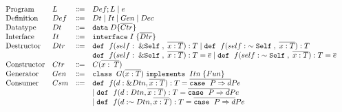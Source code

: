 \documentclass[ oneside,%
                    author={James Elgar},
                    degree={MEng},
                     title={Bidirectional transformer between functional and \\ object-oriented programming in Rust},
                  subtitle={}]{dissertation}
\begin{document}
\begin{figure}[t]
  \begin{displaymath}
    \begin{array}{l}
      \begin{array}{llcl}
        \text{Program}
        & L & \Coloneqq & Def ; L \mid e\\
        \text{Definition}
        & Def & \Coloneqq & Dt \mid It \mid Gen \mid  Dec \\
        \text{Datatype}
         & Dt & \Coloneqq & \texttt{data} \; D \{ {\overline{{Ctr}}} \}\\
        \text{Interface}
         & It & \Coloneqq & \texttt{interface} \; I \; \{ {\overline{{Dtr}}} \}\\
        \text{Destructor}
         & Dtr & \Coloneqq & \texttt{def} \; \ f(self:\; \&\texttt{Self} \;, \;\overline{x: T}): T \mid \texttt{def} \; \ f(self:\; \sim \texttt{Self} \;, \;\overline{x: T}): T\\
         &     &           &  \texttt{def} \; \ f(self:\; \&\texttt{Self} \;, \;\overline{x: T}): T = \overline{e} \mid \texttt{def} \; \ f(self:\; \sim \texttt{Self} \;, \;\overline{x: T}): T = \overline{e} \\
        \text{Constructor}
        & Ctr & \Coloneqq & C(\overline{x:\; T}) \; \\
        \text{Generator}
         & Gen & \Coloneqq & \texttt{class} \; \; {G} (\overline{{x} : {T}}) \; \texttt{implements} \; \; {Itn} \; \{ {{Fun}} \}\\
         
        \text{Consumer}
        & Csm & \Coloneqq & \texttt{def} \; \ f(d: \&Dtn, \overline{x: T}): T = \overline{\texttt{case} \;\ {P} \Rightarrow {d}} {P} {e} \\
        &     &           & \mid \texttt{def} \; \ f(d: Dtn, \overline{x: T}): T = \overline{\texttt{case} \;\ {P} \Rightarrow {d}} {P} {e}\\
        &     &           & \mid \texttt{def} \; \ f(d: \sim Dtn, \overline{x: T}): T = \overline{\texttt{case} \;\ {P} \Rightarrow {d}} {P} {e}\\
        

\end{array}
\end{array}
\end{displaymath}
\end{figure}
\end{document}
